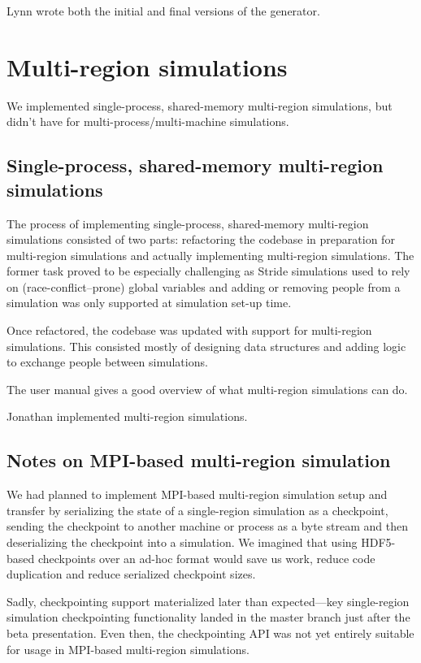 \documentclass[a4paper,12pt]{article}
\begin{document}
Lynn wrote both the initial and final versions of the generator.

\section{Multi-region simulations}

We implemented single-process, shared-memory multi-region simulations, but didn't have for multi-process/multi-machine simulations.

\subsection{Single-process, shared-memory multi-region simulations}

The process of implementing single-process, shared-memory multi-region simulations consisted of two parts: refactoring the codebase in preparation for multi-region simulations and actually implementing multi-region simulations. The former task proved to be especially challenging as Stride simulations used to rely on (race-conflict--prone) global variables and adding or removing people from a simulation was only supported at simulation set-up time.

Once refactored, the codebase was updated with support for multi-region simulations. This consisted mostly of designing data structures and adding logic to exchange people between simulations.

The user manual gives a good overview of what multi-region simulations can do.

Jonathan implemented multi-region simulations.

\subsection{Notes on MPI-based multi-region simulation}

We had planned to implement MPI-based multi-region simulation setup and transfer by serializing the state of a single-region simulation as a checkpoint, sending the checkpoint to another machine or process as a byte stream and then deserializing the checkpoint into a simulation. We imagined that using HDF5-based checkpoints over an ad-hoc format would save us work, reduce code duplication and reduce serialized checkpoint sizes.

Sadly, checkpointing support materialized later than expected---key single-region simulation checkpointing functionality landed in the master branch just after the beta presentation. Even then, the checkpointing API was not yet entirely suitable for usage in MPI-based multi-region simulations.
\end{document}
